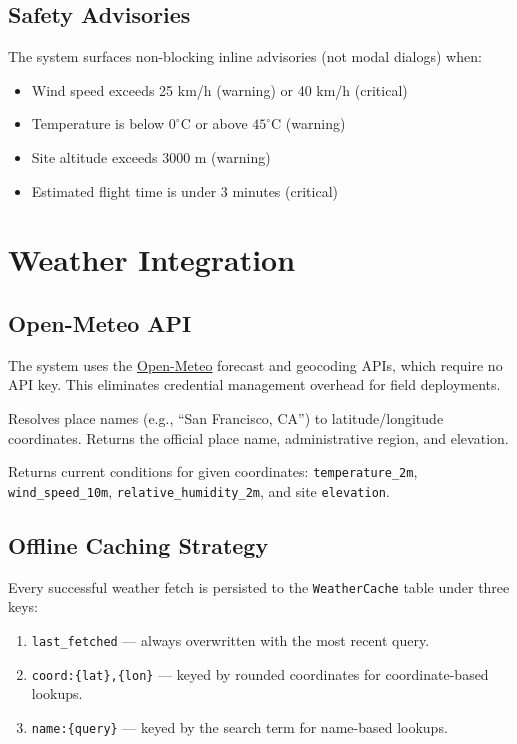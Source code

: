 \documentclass[11pt,a4paper]{article}
\begin{document}
\subsection{Safety Advisories}
The system surfaces non-blocking inline advisories (not modal dialogs) when:
\begin{itemize}[noitemsep]
    \item Wind speed exceeds 25 km/h (\textcolor{gcsamber}{warning}) or 40 km/h (\textcolor{alertred}{critical})
    \item Temperature is below $0^{\circ}$C or above $45^{\circ}$C (\textcolor{gcsamber}{warning})
    \item Site altitude exceeds 3000 m (\textcolor{gcsamber}{warning})
    \item Estimated flight time is under 3 minutes (\textcolor{alertred}{critical})
\end{itemize}

\newpage

\section{Weather Integration}

\subsection{Open-Meteo API}
The system uses the \href{https://open-meteo.com/}{Open-Meteo} forecast and geocoding APIs, which require no API key. This eliminates credential management overhead for field deployments.

\begin{description}[style=nextline]
    \item[\textbf{Geocoding API}] Resolves place names (e.g., ``San Francisco, CA'') to latitude/longitude coordinates. Returns the official place name, administrative region, and elevation.
    \item[\textbf{Forecast API}] Returns current conditions for given coordinates: \texttt{temperature\_2m}, \texttt{wind\_speed\_10m}, \texttt{relative\_humidity\_2m}, and site \texttt{elevation}.
\end{description}

\subsection{Offline Caching Strategy}
Every successful weather fetch is persisted to the \texttt{WeatherCache} table under three keys:
\begin{enumerate}[noitemsep]
    \item \texttt{last\_fetched} --- always overwritten with the most recent query.
    \item \texttt{coord:\{lat\},\{lon\}} --- keyed by rounded coordinates for coordinate-based lookups.
    \item \texttt{name:\{query\}} --- keyed by the search term for name-based lookups.
\end{enumerate}
\end{document}
